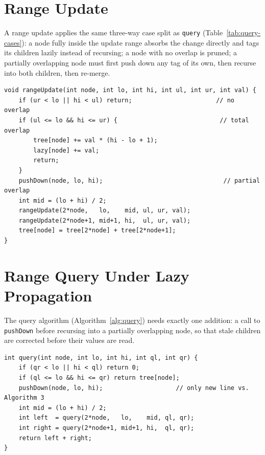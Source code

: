 \documentclass[
  11pt,
  a4paper,
  twoside=false,
  numbers=noenddot,
  headings=big,
  parskip=half,
  toc=bibliography,
  toc=listof,
  bibliography=totoc
]{scrreprt}
\begin{document}
\section{Range Update}
A range update applies the same three-way case split as \texttt{query} (Table~\ref{tab:query-cases}): a node fully inside the update range absorbs the change directly and tags its children lazily instead of recursing; a node with no overlap is pruned; a partially overlapping node must first push down any tag of its own, then recurse into both children, then re-merge.

\begin{lstlisting}[style=cpp, caption={Range update with lazy propagation (add \texttt{val} to every element in $[ul,ur]$).}, label={alg:rangeupdate}]
void rangeUpdate(int node, int lo, int hi, int ul, int ur, int val) {
    if (ur < lo || hi < ul) return;                       // no overlap
    if (ul <= lo && hi <= ur) {                            // total overlap
        tree[node] += val * (hi - lo + 1);
        lazy[node] += val;
        return;
    }
    pushDown(node, lo, hi);                                 // partial overlap
    int mid = (lo + hi) / 2;
    rangeUpdate(2*node,   lo,    mid, ul, ur, val);
    rangeUpdate(2*node+1, mid+1, hi,  ul, ur, val);
    tree[node] = tree[2*node] + tree[2*node+1];
}
\end{lstlisting}

\section{Range Query Under Lazy Propagation}
The query algorithm (Algorithm~\ref{alg:query}) needs exactly one addition: a call to \texttt{pushDown} before recursing into a partially overlapping node, so that stale children are corrected before their values are read.

\begin{lstlisting}[style=cpp, caption={Range query, adapted for a tree with lazy tags.}, label={alg:lazyquery}]
int query(int node, int lo, int hi, int ql, int qr) {
    if (qr < lo || hi < ql) return 0;
    if (ql <= lo && hi <= qr) return tree[node];
    pushDown(node, lo, hi);                    // only new line vs. Algorithm 3
    int mid = (lo + hi) / 2;
    int left  = query(2*node,   lo,    mid, ql, qr);
    int right = query(2*node+1, mid+1, hi,  ql, qr);
    return left + right;
}
\end{lstlisting}
\end{document}
